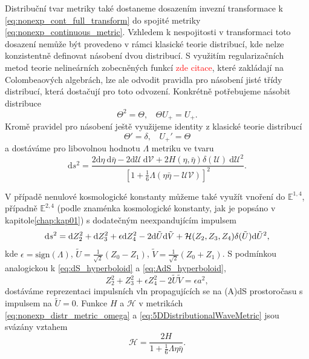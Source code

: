 Distribuční tvar metriky také dostaneme dosazením invezní transformace k \eqref{eq:nonexp_cont_full_transform} do spojité metriky 
\eqref{eq:nonexp_continuous_metric}. Vzhledem k nespojitosti v transformaci toto dosazení nemůže být provedeno
v rámci klasické teorie distribucí, kde nelze konzistentně definovat násobení dvou distribucí. S využitím regularizačních metod teorie
nelineárních zobecněných funkcí \textcolor{red}{zde citace}, které zakládají na Colombeaových algebrách, lze ale odvodit pravidla pro násobení
jisté třídy distribucí, která dostačují pro toto odvození. Konkrétně potřebujeme násobit distribuce
\begin{equation}
        \Theta^2 = \Theta, ~~~~ \Theta U_{+} = U_{+}.
\end{equation}
Kromě pravidel pro násobení ještě využijeme identity z klasické teorie distribucí
\begin{equation}
    \Theta' = \delta, ~~~~ U_{+}' = \Theta
\end{equation}
a dostáváme pro libovolnou hodnotu $\Lambda$ metriku ve tvaru
\begin{equation} \label{eq:nonexp_distr_metric_omega}
\mathrm{d}s^2=\frac{2\mathrm{d}\eta~\mathrm{d}\bar{\eta} - 2 \mathrm{d}\mathcal{U}~\mathrm{d}\mathcal{V} + 2H(\eta, \bar{\eta}) \delta(\mathcal{U}) 
~\mathrm{d}\mathcal{U}^2}{\left[1+\frac{1}{6}\Lambda(\eta \bar{\eta}-\mathcal{U}\mathcal{V})\right]^2}.
\end{equation}

V případě nenulové kosmologické konstanty můžeme také využít vnoření do $\mathbb{E}^{1,4}$, případně $\mathbb{E}^{2,4}$ (podle znaménka kosmologické
konstanty, jak je popsáno v kapitole\autoref{chap:kap01}) s dodatečným neexpandujícím impulsem
\begin{equation}
    \label{eq:5DDistributionalWaveMetric}
    \mathrm{d} s^2 = \mathrm{d} Z_2^2 + \mathrm{d} Z_3^2 + \epsilon \mathrm{d} Z_4^2 - 2 \mathrm{d} \tilde{U} \mathrm{d} \tilde{V} + \mathcal{H}(Z_2, Z_3, Z_4) \delta(\tilde{U}) \mathrm{d} \tilde{U}^2,
\end{equation}
kde $\epsilon = \text{sign} (\Lambda)$, $\tilde{U} = \tfrac{1}{\sqrt{2}}(Z_0 - Z_1)$, $\tilde{V}= \tfrac{1}{\sqrt{2}}(Z_0 + Z_1)$.
S podmínkou analogickou k \eqref{eq:dS_hyperboloid} a \eqref{eq:AdS_hyperboloid},
\begin{equation}
    Z_2^2 + Z_3^2 + \epsilon Z_4^2 - 2 \tilde{U} \tilde{V} = \epsilon a^2,
\end{equation}
dostáváme reprezentaci impulsních vln propagujících se na (A)dS prostoročasu s impulsem na $\tilde{U}=0$. 
Funkce $H$ a $\mathcal{H}$ v metrikách \eqref{eq:nonexp_distr_metric_omega} a \eqref{eq:5DDistributionalWaveMetric} jsou svázány vztahem
\begin{equation}
    \mathcal{H} = \frac{2H}{1+\frac{1}{6}\Lambda \eta \bar{\eta}}.
\end{equation}

